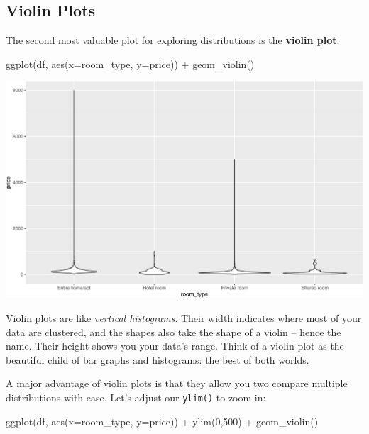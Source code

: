 \documentclass[
]{book}
\newenvironment{Shaded}{\begin{snugshade}}{\end{snugshade}}
\newcommand{\AttributeTok}[1]{\textcolor[rgb]{0.77,0.63,0.00}{#1}}
\newcommand{\DecValTok}[1]{\textcolor[rgb]{0.00,0.00,0.81}{#1}}
\newcommand{\FunctionTok}[1]{\textcolor[rgb]{0.00,0.00,0.00}{#1}}
\newcommand{\NormalTok}[1]{#1}
\newcommand{\SpecialCharTok}[1]{\textcolor[rgb]{0.00,0.00,0.00}{#1}}
\begin{document}
\hypertarget{violin-plots}{%
\subsection*{Violin Plots}\label{violin-plots}}

The second most valuable plot for exploring distributions is the \textbf{violin plot}.

\begin{Shaded}
\begin{Highlighting}[]
\FunctionTok{ggplot}\NormalTok{(df, }\FunctionTok{aes}\NormalTok{(}\AttributeTok{x=}\NormalTok{room\_type,}
               \AttributeTok{y=}\NormalTok{price)) }\SpecialCharTok{+} 
  \FunctionTok{geom\_violin}\NormalTok{()}
\end{Highlighting}
\end{Shaded}

\includegraphics{figures/unnamed-chunk-219-1.pdf}

Violin plots are like \emph{vertical histograms}. Their width indicates where most of your data are clustered, and the shapes also take the shape of a violin -- hence the name. Their height shows you your data's range. Think of a violin plot as the beautiful child of bar graphs and histograms: the best of both worlds.

A major advantage of violin plots is that they allow you two compare multiple distributions with ease. Let's adjust our \texttt{ylim()} to zoom in:

\begin{Shaded}
\begin{Highlighting}[]
\FunctionTok{ggplot}\NormalTok{(df, }
       \FunctionTok{aes}\NormalTok{(}\AttributeTok{x=}\NormalTok{room\_type,}
           \AttributeTok{y=}\NormalTok{price)) }\SpecialCharTok{+} 
  \FunctionTok{ylim}\NormalTok{(}\DecValTok{0}\NormalTok{,}\DecValTok{500}\NormalTok{) }\SpecialCharTok{+}
  \FunctionTok{geom\_violin}\NormalTok{()}
\end{Highlighting}
\end{Shaded}
\end{document}
